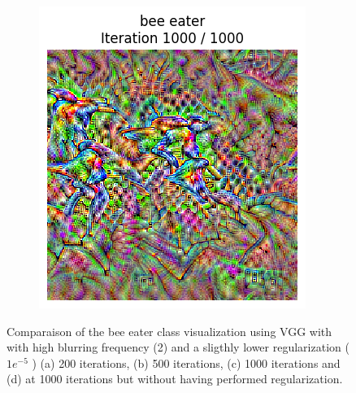 \begin{figure}[H]
\begin{subfigure}[t]{.25\textwidth}
        \includegraphics[width=\linewidth]{VGG/VGG_bird_animated_1000_last_frame.png}
        \caption{}
        \label{fig:class_viz_iter_vgg:sub4}
    \end{subfigure}
    \caption{Comparaison of the bee eater class visualization using VGG with with high blurring frequency (2) and a sligthly lower regularization ($ 1e^{-5} $ ) (a) 200 iterations, (b) 500 iterations, (c) 1000 iterations and (d) at 1000 iterations but without having performed regularization.}
    \label{fig:class_viz_iter_vgg}
\end{figure}

